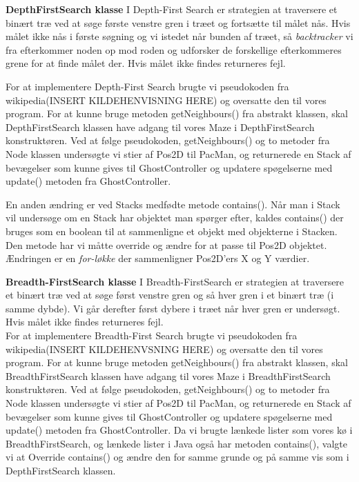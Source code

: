 \documentclass{article}
\theoremstyle{mytheoremstyle}
\theoremstyle{mytheoremstyle}
\theoremstyle{myproblemstyle}
\begin{document}
\textbf{DepthFirstSearch klasse }
I Depth-First Search er strategien at traversere et binært træ ved at søge første venstre gren i træet og fortsætte til målet nås. 
Hvis målet ikke nås i første søgning og vi istedet når bunden af træet, så \textit{backtracker} vi fra efterkommer noden op mod roden og udforsker de forskellige efterkommeres grene for at finde målet der. 
Hvis målet ikke findes returneres fejl.

For at implementere Depth-First Search brugte vi pseudokoden fra wikipedia(INSERT KILDEHENVISNING HERE) og oversatte den til vores program. 
For at kunne bruge metoden getNeighbours() fra abstrakt klassen, skal DepthFirstSearch klassen have adgang til vores Maze i DepthFirstSearch konstruktøren. 
Ved at følge pseudokoden, getNeighbours() og to metoder fra Node klassen undersøgte vi stier af Pos2D til PacMan, og returnerede en Stack af bevægelser som kunne gives til GhostController og updatere spøgelserne med update() metoden fra GhostController. 

En anden ændring er ved Stacks medfødte metode contains(). 
Når man i Stack vil undersøge om en Stack har objektet man spørger efter, kaldes contains() der bruges som en boolean til at sammenligne et objekt med objekterne i Stacken. 
Den metode har vi måtte override og ændre for at passe til Pos2D objektet. 
Ændringen er en \textit{for-løkke} der sammenligner Pos2D'ers X og Y værdier.

\textbf{Breadth-FirstSearch klasse} 
I Breadth-FirstSearch er strategien at traversere et binært træ ved at søge først venstre gren og så hver gren i et binært træ (i samme dybde). 
Vi går derefter først dybere i træet når hver gren er undersøgt. Hvis målet ikke findes returneres fejl.\\

For at implementere Breadth-First Search brugte vi pseudokoden fra wikipedia(INSERT KILDEHENVSNING HERE) og oversatte den til vores program. 
For at kunne bruge metoden getNeighbours() fra abstrakt klassen, skal BreadthFirstSearch klassen have adgang til vores Maze i BreadthFirstSearch konstruktøren. 
Ved at følge pseudokoden, getNeighbours() og to metoder fra Node klassen undersøgte vi stier af Pos2D til PacMan, 
og returnerede en Stack af bevægelser som kunne gives til GhostController og updatere spøgelserne med update() metoden fra GhostController. 
Da vi brugte lænkede lister som vores kø i BreadthFirstSearch, 
og lænkede lister i Java også har metoden contains(),  valgte vi at Override contains() og ændre den for samme grunde og på samme vis som i DepthFirstSearch klassen.
\end{document}

